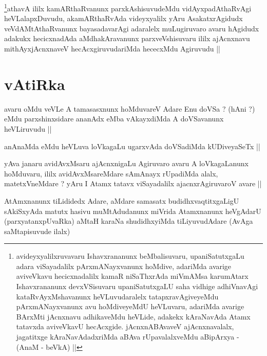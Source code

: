
\begin{artha}
\footnote{avideyxyalilxruvavaru Ishavxrananunx beMbalisuvaru,
  upaniSatutxgaLu adara viSayadalilx pArxmANayxvanunx hoMdive,
  adariMda avarige aviveVkavu hecicxnadalilx kamaR niSaThxrAda
  miVmAMsa karumAtarx Ishavxrananunx devxVSisuvaru upaniSatutxgaLU
  saha vidhige adhiVnavAgi kataRvAyxMshavanunx heVLuvudaralelx
  tatapxravAgiveyeMdu pArxmANayxvanunx avu hoMdiveyeMdU heVLuvaru,
  adariMda avarige BArxMti jAcnxnavu adhikaveMdu heVLide, adakekx
  kAraNavAda Atamx tatavxda aviveVkavU hecAcxgide. jAcnxnABAvaveV
  ajAcnxnavalalx, jagatitxge kAraNavAdadxriMda aBAva rUpavalalxveMdu
  aBipArxya - (AnaM - beVkA) ||}athavA ililx kamARthaRvanunx parxkAshisuvudeMdu vidAyxpadAthaRvAgi
heVLalapxDuvudu, akamARthaRvAda videyxyalilx yAru AsakatxrAgidudx
veVdAMtAthaRvanunx bayasadavarAgi adaralelx  muLugiruvaro avaru
hAgidudx adakukx hecicxnadAda aMdhakAravanunx parxveVshisuvaru ililx
ajAcnxnavu mithAyxjAcnxnaveV hecAcxgiruvudariMda hececxMdu Agiruvudu ||
\end{artha}

\section*{vAtiRka}

\begin{artha}
avaru oMdu veVLe A tamasasxnunx hoMduvareV Adare Enu doVSa ? (hAni ?)
eMdu parxshinxsidare ananAdx eMba vAkayxdiMda A doVSavanunx
heVLiruvudu ||
\end{artha}

\begin{artha}
anAnaMda eMdu heVLuva loVkagaLu ugarxvAda doVSadiMda kUDiveyaSeTx ||
\end{artha}

\begin{artha}
yAva janaru avidAvxMsaru ajAcnxnigaLu Agiruvaro avaru A loVkagaLanunx
hoMduvaru, ililx avidAvxMsareMdare sAmAnayx rUpadiMda alalx,
matetxVneMdare ? yAru I Atamx tatavx viSayadalilx ajacnxrAgiruvaroV
avare ||
\end{artha}


\begin{artha}
AtAmxnanunx tiLididedx Adare, aMdare samasatx budidhxvaqtitxgaLigU
sAkiSxyAda matutx hasivu muMtAdudanunx miVrida Atamxnanunx heVgAdarU
(parxyatanxpUvaRka) aMtaH karaNa shudidhxyiMda tiLiyuvudAdare (AvAga
saMtapisuvude ilalx)
\end{artha}

